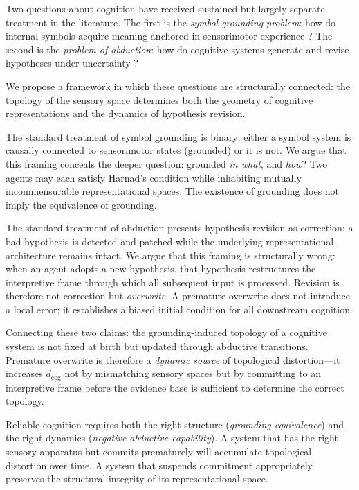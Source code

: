 \documentclass[12pt]{article}
\begin{document}
Two questions about cognition have received sustained but largely
separate treatment in the literature.
The first is the \emph{symbol grounding problem}: how do internal
symbols acquire meaning anchored in sensorimotor experience
\cite{harnad1990}?
The second is the \emph{problem of abduction}: how do cognitive
systems generate and revise hypotheses under uncertainty
\cite{peirce1903,harman1965}?

We propose a framework in which these questions are structurally
connected: the topology of the sensory space determines both the
geometry of cognitive representations and the dynamics of hypothesis
revision.

The standard treatment of symbol grounding is binary: either a symbol
system is causally connected to sensorimotor states (grounded) or it
is not.
We argue that this framing conceals the deeper question: grounded
\emph{in what}, and \emph{how}?
Two agents may each satisfy Harnad's condition while inhabiting mutually
incommensurable representational spaces.
The existence of grounding does not imply the equivalence of grounding.

The standard treatment of abduction presents hypothesis revision as
correction: a bad hypothesis is detected and patched while the
underlying representational architecture remains intact.
We argue that this framing is structurally wrong: when an agent adopts
a new hypothesis, that hypothesis restructures the interpretive frame
through which all subsequent input is processed.
Revision is therefore not correction but \emph{overwrite}.
A premature overwrite does not introduce a local error; it establishes
a biased initial condition for all downstream cognition.

Connecting these two claims: the grounding-induced topology of a
cognitive system is not fixed at birth but updated through abductive
transitions.
Premature overwrite is therefore a \emph{dynamic source} of topological
distortion---it increases $d_\mathrm{cog}$ not by mismatching sensory
spaces but by committing to an interpretive frame before the evidence
base is sufficient to determine the correct topology.

Reliable cognition requires both the right structure (\emph{grounding
equivalence}) and the right dynamics (\emph{negative abductive
capability}).
A system that has the right sensory apparatus but commits prematurely
will accumulate topological distortion over time.
A system that suspends commitment appropriately preserves the structural
integrity of its representational space.
\end{document}
